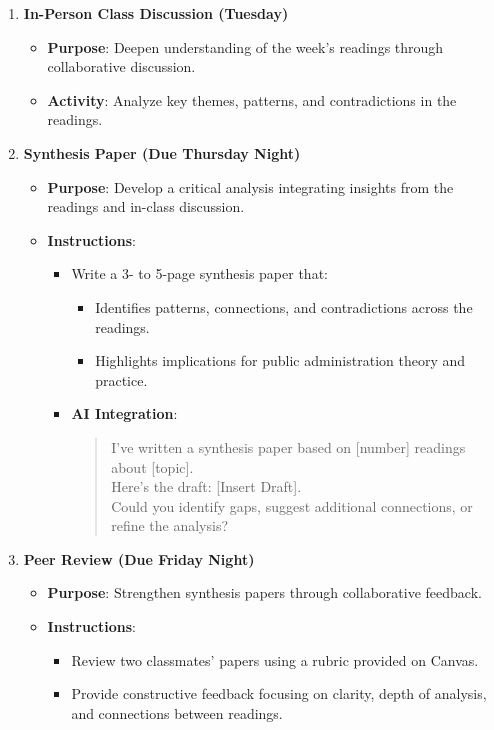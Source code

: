 \documentclass[11pt, letterpaper]{article}
\begin{document}
\begin{enumerate}
    \item \textbf{In-Person Class Discussion (Tuesday)}
    \begin{itemize}
        \item \textbf{Purpose}: Deepen understanding of the week’s readings through collaborative discussion.
        \item \textbf{Activity}: Analyze key themes, patterns, and contradictions in the readings.
    \end{itemize}

    \item \textbf{Synthesis Paper (Due Thursday Night)}
    \begin{itemize}
        \item \textbf{Purpose}: Develop a critical analysis integrating insights from the readings and in-class discussion.
        \item \textbf{Instructions}:
        \begin{itemize}
            \item Write a 3- to 5-page synthesis paper that:
            \begin{itemize}
                \item Identifies patterns, connections, and contradictions across the readings.
                \item Highlights implications for public administration theory and practice.
            \end{itemize}
            \item \textbf{AI Integration}:
            \begin{quote}
                I’ve written a synthesis paper based on [number] readings about [topic]. \\ 
                Here’s the draft: [Insert Draft]. \\ 
                Could you identify gaps, suggest additional connections, or refine the analysis?
            \end{quote}
        \end{itemize}
    \end{itemize}

    \item \textbf{Peer Review (Due Friday Night)}
    \begin{itemize}
        \item \textbf{Purpose}: Strengthen synthesis papers through collaborative feedback.
        \item \textbf{Instructions}:
        \begin{itemize}
            \item Review two classmates’ papers using a rubric provided on Canvas.
            \item Provide constructive feedback focusing on clarity, depth of analysis, and connections between readings.
        \end{itemize}
    \end{itemize}


\end{enumerate}
\end{document}

